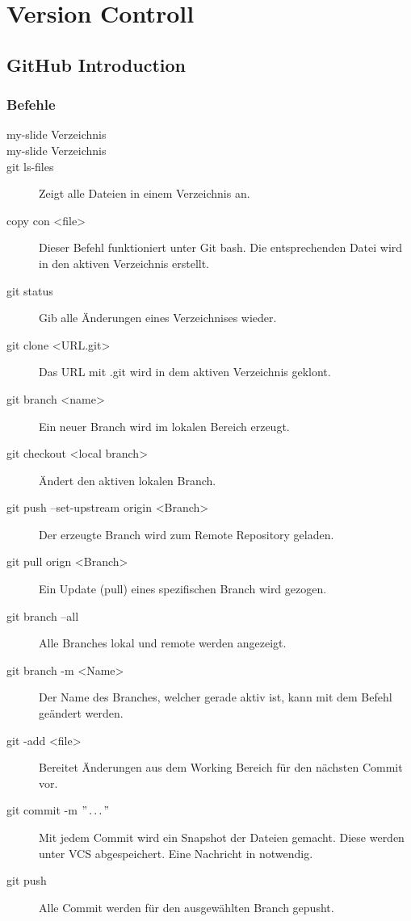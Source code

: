 \pagebreak
\chapter{Version Controll}
\setcounter{section}{0}

\section{GitHub Introduction}
\subsection{Befehle}
\begin{description}
	\item[my-slide Verzeichnis] %
	\item[my-slide Verzeichnis] %
	\item[git ls-files] Zeigt alle Dateien in einem Verzeichnis an.
	\item[copy con <file>] Dieser Befehl funktioniert unter Git bash. Die entsprechenden Datei wird in den aktiven Verzeichnis erstellt.
	\item[git status] Gib alle Änderungen eines Verzeichnises wieder.
	\item[git clone <URL.git>] Das URL mit .git wird in dem aktiven Verzeichnis geklont.
	\item[git branch <name>] Ein neuer Branch wird im lokalen Bereich erzeugt.
	\item[git checkout <local branch>] Ändert den aktiven lokalen Branch.
	\item[git push --set-upstream origin <Branch>] Der erzeugte Branch wird zum Remote Repository geladen.
	\item[git pull orign <Branch>] Ein Update (pull) eines spezifischen Branch wird gezogen.
	\item[git branch --all] Alle Branches lokal und remote werden angezeigt.
	\item[git branch -m <Name>] Der Name des Branches, welcher gerade aktiv ist, kann mit dem Befehl geändert werden.
	\item[git -add <file>] Bereitet Änderungen aus dem Working Bereich für den nächsten Commit vor.
	\item[git commit -m $"\dots "$] Mit jedem Commit wird ein Snapshot der Dateien gemacht. Diese werden unter \gls{VCS} abgespeichert. Eine Nachricht in notwendig.
	\item[git push] Alle Commit werden für den ausgewählten Branch gepusht.

\end{description}
